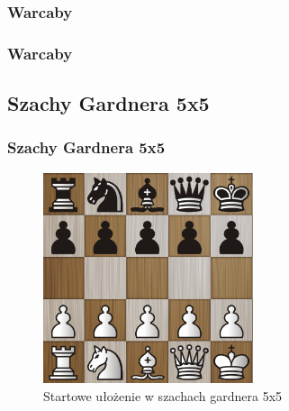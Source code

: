 \documentclass[polish,envcountsect,10pt]{beamer}
\begin{document}
            \subsubsection{Warcaby}
                \begin{frame}
                    \frametitle{Warcaby}
                \end{frame}
            \subsection{Szachy Gardnera 5x5}
                \begin{frame}
                    \frametitle{Szachy Gardnera 5x5}
                    \begin{figure}[H]
                        \centering
                        \includegraphics[width=0.55\textwidth]{images/gardner.png}
                        \caption{Startowe ułożenie w szachach gardnera 5x5}
                    \end{figure}
                \end{frame}
\end{document}
